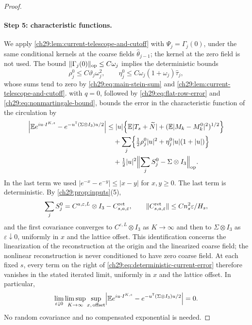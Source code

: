 \begin{proof}
\paragraph{Step 5: characteristic functions.}
We apply \cref{ch29:lem:current-telescope-and-cutoff} with $\Psi_j=\Gamma_j(0)$, under the same conditional kernels at the coarse fields $\widehat\theta_{j-1}$; the kernel at the zero field is not used. The bound $\|\Gamma_j(0)\|_{\rm op}\le C\omega_j$ implies the deterministic bounds
\[
 \rho_j^0\le C\vartheta_j\omega_j^2,\qquad \eta_j^0\le C\omega_j(1+\omega_j)\widehat\tau_j,
\]
whose sums tend to zero by \eqref{ch29:eq:main-stein-sum} and \cref{ch29:lem:current-telescope-and-cutoff}.  with $q=0$, followed by \eqref{ch29:eq:flat-row-error} and \eqref{ch29:eq:nonmartingale-bound}, bounds the error in the characteristic function of the circulation by
\begin{equation}\label{ch29:eq:deterministic-current-error}
\begin{split}
 \Bigl|\mathbb E e^{iu\cdot I^{K,s}}-e^{-u^{\mathsf T}(\Sigma\otimes I_3)u/2}\Bigr|&\le|u|\Bigl\{\mathbb E|T_s+\widetilde N|+(\mathbb E|M_k-M_k^0|^2)^{1/2}\Bigr\}\\
 &\quad+\sum_j\Bigl\{\tfrac12\rho_j^0|u|^2+\eta_j^0|u|(1+|u|)\Bigr\}\\
 &\quad+\tfrac12|u|^2\Bigl\|\sum_jS_j^0-\Sigma\otimes I_3\Bigr\|_{\rm op}.
\end{split}
\end{equation}
In the last term we used $|e^{-x}-e^{-y}|\le|x-y|$ for $x,y\ge0$. The last term is deterministic. By \cref{ch29:prop:inputs}(5),
\[
 \sum_jS_j^0=C^{a,\varepsilon,L}\otimes I_3-C^{\rm ret}_{s,a,\varepsilon},\qquad\|C^{\rm ret}_{s,a,\varepsilon}\|\le Cn_s^2\varepsilon/H_s,
\]
and the first covariance converges to $C^{\varepsilon,L}\otimes I_3$ as $K\to\infty$ and then to $\Sigma\otimes I_3$ as $\varepsilon\downarrow0$, uniformly in $x$ and the lattice offset. This identification concerns the linearization of the reconstruction at the origin and the linearized coarse field; the nonlinear reconstruction is never conditioned to have zero coarse field. At each fixed $s$, every term on the right of \eqref{ch29:eq:deterministic-current-error} therefore vanishes in the stated iterated limit, uniformly in $x$ and the lattice offset. In particular,
\begin{equation}\label{ch29:eq:current-characteristic-limit}
 \lim_{\varepsilon\downarrow0}\limsup_{K\to\infty}\sup_{x,\,\text{offset}}\Bigl|\mathbb E e^{iu\cdot I^{K,s}}-e^{-u^{\mathsf T}(\Sigma\otimes I_3)u/2}\Bigr|=0.
\end{equation}
No random covariance and no compensated exponential is needed.


\end{proof}
